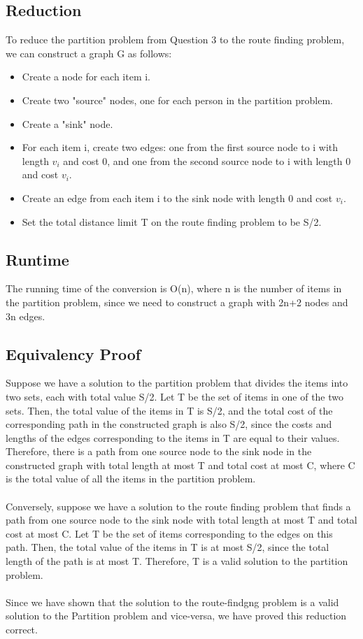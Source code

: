 \documentclass{article}
\begin{document}
\subsection{Reduction}
To reduce the partition problem from Question 3 to the route finding problem, we can construct a graph G as follows:
\begin{itemize}
    \item Create a node for each item i.
    \item Create two "source" nodes, one for each person in the partition problem.
    \item Create a "sink" node.
    \item For each item i, create two edges: one from the first source node to i with length $v_i$ and cost 0, and one from the second source node to i with length 0 and cost $v_i$.
    \item Create an edge from each item i to the sink node with length 0 and cost $v_i$.
    \item Set the total distance limit T on the route finding problem to be S/2.
\end{itemize}

\subsection{Runtime}
The running time of the conversion is O(n), where n is the number of items in the partition problem, since we need to construct a graph with 2n+2 nodes and 3n edges.

\subsection{Equivalency Proof}
Suppose we have a solution to the partition problem that divides the items into two sets, each with total value S/2. Let T be the set of items in one of the two sets. Then, the total value of the items in T is S/2, and the total cost of the corresponding path in the constructed graph is also S/2, since the costs and lengths of the edges corresponding to the items in T are equal to their values. Therefore, there is a path from one source node to the sink node in the constructed graph with total length at most T and total cost at most C, where C is the total value of all the items in the partition problem.\\\\
Conversely, suppose we have a solution to the route finding problem that finds a path from one source node to the sink node with total length at most T and total cost at most C. Let T be the set of items corresponding to the edges on this path. Then, the total value of the items in T is at most S/2, since the total length of the path is at most T. Therefore, T is a valid solution to the partition problem.\\\\
Since we have shown that the solution to the route-findgng problem is a valid solution to the Partition problem and vice-versa, we have proved this reduction correct.
\end{document}
